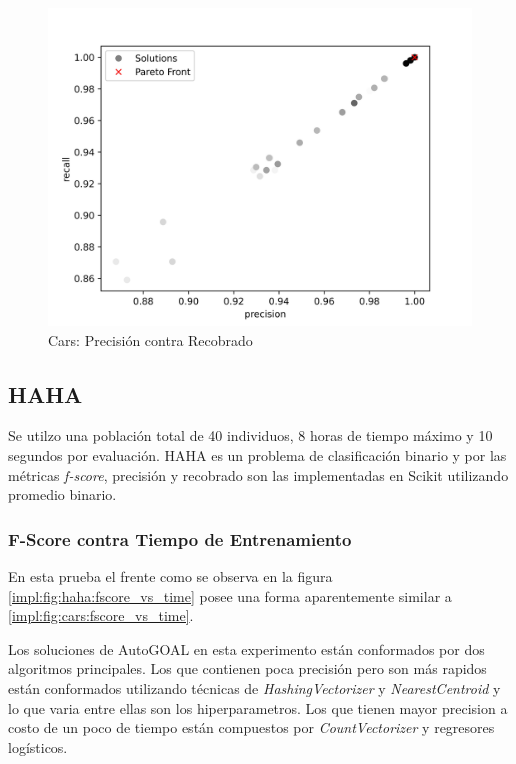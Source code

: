 \begin{figure}[ht]
    \centering
    \includegraphics[scale=0.65]{Pictures/cars_precision_vs_recall.jpg}
    \caption{Cars: Precisi\'on contra Recobrado}
    \label{impl:fig:cars:precision_vs_recall}
\end{figure}

\subsection{HAHA}
Se utilzo una poblaci\'on total de 40 individuos, 8 horas de tiempo m\'aximo y 10 segundos por  evaluaci\'on. 
HAHA es un problema de clasificaci\'on binario y por las m\'etricas \textit{f-score}, precisi\'on y recobrado son las implementadas en Scikit utilizando promedio binario.

\subsubsection{F-Score contra Tiempo de Entrenamiento}

En esta prueba el frente como se observa en la figura \ref{impl:fig:haha:fscore_vs_time} posee una forma aparentemente similar a \ref{impl:fig:cars:fscore_vs_time}. 

Los soluciones de AutoGOAL en esta experimento est\'an conformados por dos algoritmos principales. Los que contienen poca precisi\'on pero son m\'as rapidos est\'an conformados utilizando t\'ecnicas de \textit{HashingVectorizer} y \textit{NearestCentroid} y  lo que varia entre ellas son los hiperparametros.
Los que tienen mayor precision a costo de un poco de tiempo est\'an compuestos por \textit{CountVectorizer}  y regresores log\'isticos.

